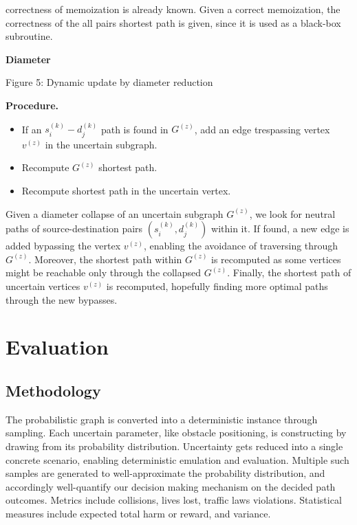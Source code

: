 \documentclass[pdflatex,sn-mathphys-num]{sn-jnl}%
\begin{document}
correctness of memoization is already known. Given a correct memoization, the correctness of the all pairs shortest path is given, since it is used as a black-box subroutine.


\textbf{Diameter}

\begin{center}
    
    Figure 5: Dynamic update by diameter reduction
\end{center}

\textbf{Procedure.}
\begin{itemize}
    \item If an $s_i^{(k)}-d_j^{(k)}$ path is found in $G^{(z)}$, add an edge trespassing vertex $v^{(z)}$ in the uncertain subgraph.
    \item Recompute $G^{(z)}$ shortest path.
    \item Recompute shortest path in the uncertain vertex.
\end{itemize}

Given a diameter collapse of an uncertain subgraph $G^{(z)}$, we look for neutral paths of source-destination pairs $(s_i^{(k)}, d_j^{(k)})$ within it. If found, a new edge is added bypassing the vertex $v^{(z)}$, enabling the avoidance of traversing through $G^{(z)}$. Moreover, the shortest path within $G^{(z)}$ is recomputed as some vertices might be reachable only through the collapsed $G^{(z)}$. Finally, the shortest path of uncertain vertices $v^{(z)}$ is recomputed, hopefully finding more optimal paths through the new bypasses.



\section{Evaluation} \label{Evaluation}

\subsection{Methodology} \label{Methodology}

The probabilistic graph is converted into a deterministic instance through sampling. Each uncertain parameter, like obstacle positioning, is constructing by drawing from its probability distribution. Uncertainty gets reduced into a single concrete scenario, enabling deterministic emulation and evaluation. Multiple such samples are generated to well-approximate the probability distribution, and accordingly well-quantify our decision making mechanism on the decided path outcomes. Metrics include collisions, lives lost, traffic laws violations. Statistical measures include expected total harm or reward, and variance.
\end{document}
